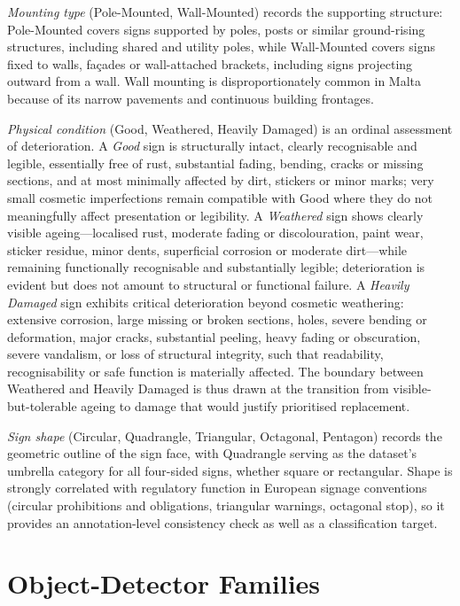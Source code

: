 \emph{Mounting type} (Pole-Mounted, Wall-Mounted) records the supporting structure: Pole-Mounted covers signs supported by poles, posts or similar ground-rising structures, including shared and utility poles, while Wall-Mounted covers signs fixed to walls, fa\c{c}ades or wall-attached brackets, including signs projecting outward from a wall. Wall mounting is disproportionately common in Malta because of its narrow pavements and continuous building frontages.

\emph{Physical condition} (Good, Weathered, Heavily Damaged) is an ordinal assessment of deterioration. A \emph{Good} sign is structurally intact, clearly recognisable and legible, essentially free of rust, substantial fading, bending, cracks or missing sections, and at most minimally affected by dirt, stickers or minor marks; very small cosmetic imperfections remain compatible with Good where they do not meaningfully affect presentation or legibility. A \emph{Weathered} sign shows clearly visible ageing---localised rust, moderate fading or discolouration, paint wear, sticker residue, minor dents, superficial corrosion or moderate dirt---while remaining functionally recognisable and substantially legible; deterioration is evident but does not amount to structural or functional failure. A \emph{Heavily Damaged} sign exhibits critical deterioration beyond cosmetic weathering: extensive corrosion, large missing or broken sections, holes, severe bending or deformation, major cracks, substantial peeling, heavy fading or obscuration, severe vandalism, or loss of structural integrity, such that readability, recognisability or safe function is materially affected. The boundary between Weathered and Heavily Damaged is thus drawn at the transition from visible-but-tolerable ageing to damage that would justify prioritised replacement.

\emph{Sign shape} (Circular, Quadrangle, Triangular, Octagonal, Pentagon) records the geometric outline of the sign face, with Quadrangle serving as the dataset's umbrella category for all four-sided signs, whether square or rectangular. Shape is strongly correlated with regulatory function in European signage conventions (circular prohibitions and obligations, triangular warnings, octagonal stop), so it provides an annotation-level consistency check as well as a classification target.

\section{Object-Detector Families}
\label{sec:bg-detectors}

